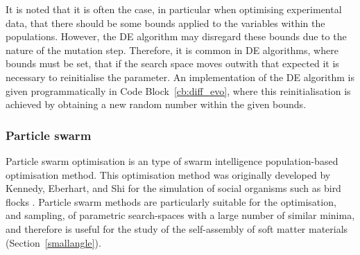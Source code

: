 It is noted that it is often the case, in particular when optimising experimental data, that there should be some bounds applied to the variables within the populations.
However, the DE algorithm may disregard these bounds due to the nature of the mutation step.
Therefore, it is common in DE algorithms, where bounds must be set, that if the search space moves outwith that expected it is necessary to reinitialise the parameter.
An implementation of the DE algorithm is given programmatically in Code Block~\ref{cb:diff_evo}, where this reinitialisation is achieved by obtaining a new random number within the given bounds.
%
\begin{figure}
        
\end{figure}
%
%
\begin{figure}
    \centering
        
\end{figure}
%
%
\begin{figure}
    \centering
        
\end{figure}
%
%
\begin{figure}
    \centering
        
\end{figure}
%

\subsubsection{Particle swarm}
\label{sec:partswarm}
Particle swarm optimisation is an type of swarm intelligence population-based optimisation method.
This optimisation method was originally developed by Kennedy, Eberhart, and Shi for the simulation of social organisms such as bird flocks \cite{kennedy_particle_1995,shi_modified_1998}.
Particle swarm methods are particularly suitable for the optimisation, and sampling, of parametric search-spaces with a large number of similar minima, and therefore is useful for the study of the self-assembly of soft matter materials (Section~\ref{smallangle}).

